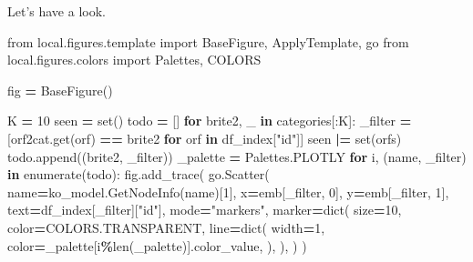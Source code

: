 \documentclass[
]{book}
\newenvironment{Shaded}{\begin{snugshade}}{\end{snugshade}}
\newcommand{\BuiltInTok}[1]{#1}
\newcommand{\ControlFlowTok}[1]{\textcolor[rgb]{0.13,0.29,0.53}{\textbf{#1}}}
\newcommand{\DecValTok}[1]{\textcolor[rgb]{0.00,0.00,0.81}{#1}}
\newcommand{\ImportTok}[1]{#1}
\newcommand{\KeywordTok}[1]{\textcolor[rgb]{0.13,0.29,0.53}{\textbf{#1}}}
\newcommand{\NormalTok}[1]{#1}
\newcommand{\OperatorTok}[1]{\textcolor[rgb]{0.81,0.36,0.00}{\textbf{#1}}}
\newcommand{\StringTok}[1]{\textcolor[rgb]{0.31,0.60,0.02}{#1}}
\begin{document}
Let's have a look.

\begin{Shaded}
\begin{Highlighting}[numbers=left,,]
\ImportTok{from}\NormalTok{ local.figures.template }\ImportTok{import}\NormalTok{ BaseFigure, ApplyTemplate, go}
\ImportTok{from}\NormalTok{ local.figures.colors }\ImportTok{import}\NormalTok{ Palettes, COLORS}

\NormalTok{fig }\OperatorTok{=}\NormalTok{ BaseFigure()}

\NormalTok{K }\OperatorTok{=} \DecValTok{10}
\NormalTok{seen }\OperatorTok{=} \BuiltInTok{set}\NormalTok{()}
\NormalTok{todo }\OperatorTok{=}\NormalTok{ []}
\ControlFlowTok{for}\NormalTok{ brite2, \_ }\KeywordTok{in}\NormalTok{ categories[:K]:}
\NormalTok{    \_filter }\OperatorTok{=}\NormalTok{ [orf2cat.get(orf) }\OperatorTok{==}\NormalTok{ brite2 }\ControlFlowTok{for}\NormalTok{ orf }\KeywordTok{in}\NormalTok{ df\_index[}\StringTok{"id"}\NormalTok{]]}
\NormalTok{    seen }\OperatorTok{|=} \BuiltInTok{set}\NormalTok{(orfs)}
\NormalTok{    todo.append((brite2, \_filter))}
\NormalTok{\_palette }\OperatorTok{=}\NormalTok{ Palettes.PLOTLY}
\ControlFlowTok{for}\NormalTok{ i, (name, \_filter) }\KeywordTok{in} \BuiltInTok{enumerate}\NormalTok{(todo):}
\NormalTok{    fig.add\_trace(}
\NormalTok{        go.Scatter(}
\NormalTok{            name}\OperatorTok{=}\NormalTok{ko\_model.GetNodeInfo(name)[}\DecValTok{1}\NormalTok{],}
\NormalTok{            x}\OperatorTok{=}\NormalTok{emb[\_filter, }\DecValTok{0}\NormalTok{],}
\NormalTok{            y}\OperatorTok{=}\NormalTok{emb[\_filter, }\DecValTok{1}\NormalTok{],}
\NormalTok{            text}\OperatorTok{=}\NormalTok{df\_index[\_filter][}\StringTok{"id"}\NormalTok{],}
\NormalTok{            mode}\OperatorTok{=}\StringTok{"markers"}\NormalTok{,}
\NormalTok{            marker}\OperatorTok{=}\BuiltInTok{dict}\NormalTok{(}
\NormalTok{                size}\OperatorTok{=}\DecValTok{10}\NormalTok{,}
\NormalTok{                color}\OperatorTok{=}\NormalTok{COLORS.TRANSPARENT,}
\NormalTok{                line}\OperatorTok{=}\BuiltInTok{dict}\NormalTok{(}
\NormalTok{                    width}\OperatorTok{=}\DecValTok{1}\NormalTok{,}
\NormalTok{                    color}\OperatorTok{=}\NormalTok{\_palette[i}\OperatorTok{\%}\BuiltInTok{len}\NormalTok{(\_palette)].color\_value,}
\NormalTok{                ),}
\NormalTok{            ),}
\NormalTok{        )}
\NormalTok{    )}


\end{Highlighting}
\end{Shaded}
\end{document}
